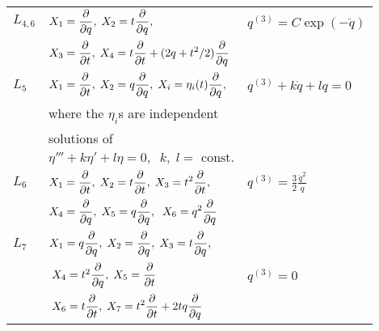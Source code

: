 \begin{table}
\begin{center}
\begin{tabular}{|l|l|l|}
\hline
$L_{4,6}$ & $X_1=\dq,\;X_2=t\dq,$ &
$q^{(3)}=C\exp (-\ddot q)$ \\
& $X_3=\dt,\;X_4=t\dt+(2q+t^2/2)\dq$ & \\
\hline
$L_{5}$ & $ X_1=\dt,\;X_2=q\dq,\;X_i=\eta_i (t)\dq,$ &
$ q^{(3)}+k\dot q+lq=0$\\
 & where the $\eta_i$s are independent & \\
 & solutions of  & \\
 & $\eta '''+k\eta '+l\eta=0,\;\;k,\;l=\mbox{ const.}$ & \\
\hline
$L_6$ & $X_1=\dt,\;X_2=t\dt,\;X_3=t^2\dt,$ & $q^{(3)}=\displaystyle{
\frac{3}{2}\frac{\ddot q^2}{\dot q}}$\\
 & $X_4=\dq,\;X_5=q\dq,\;\;X_6=q^2\dq$ &    \\
\hline
$L_7$ & $X_1=q\dq,\;X_2=\dq,\;X_3=t\dq,$ & \\
& $\;X_4=t^2\dq,\;X_5=\dt$ & $q^{(3)}=0$ \\ 
   & $\;X_6=t\dt,\; X_7=t^2\dt+2tq\dq$ & \\
\hline
\end{tabular}
\end{center}
\end{table}





